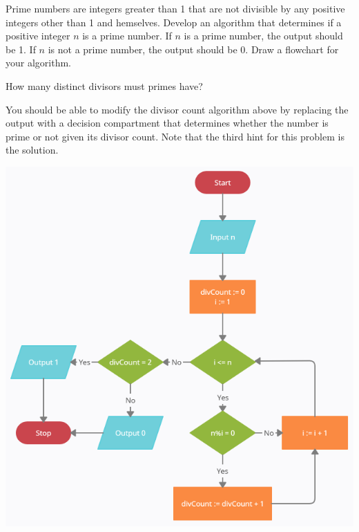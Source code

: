 \documentclass{ximera}
\begin{document}
\begin{question}
	 Prime numbers are integers greater than 1 that are not divisible by any positive integers other than 1 and hemselves. Develop an algorithm that determines if a positive integer $n$ is a prime number. If $n$ is a prime number, the output should be 1. If $n$ is not a prime number, the output should be 0. Draw a flowchart for your algorithm.
	\begin{hint}
		How many distinct divisors must primes have?
	\end{hint}
	\begin{hint}
		You should be able to modify the divisor count algorithm above by replacing the output with a decision compartment that determines whether the number is prime or not given its divisor count. Note that the third hint for this problem is the solution.
	\end{hint}
	\begin{hint}
	\begin{center}
		\includegraphics{primes.png}
	\end{center}
	\end{hint}
\end{question}
\end{document}

